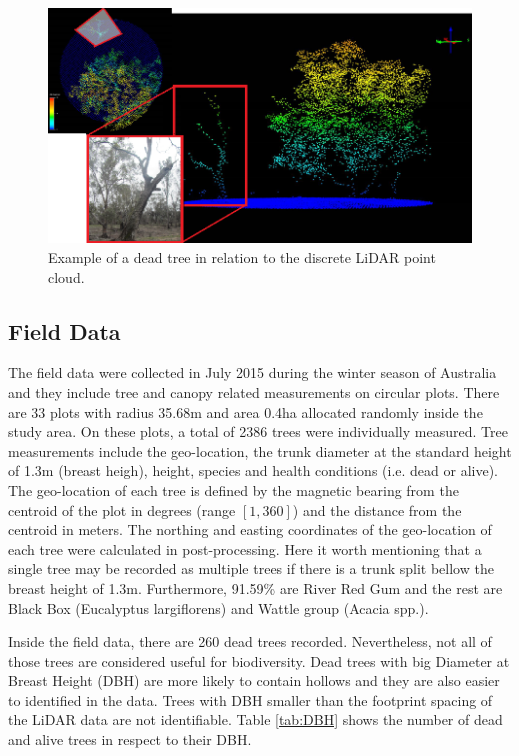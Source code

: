 \documentclass{subfiles}
\begin{document}
 \begin{figure} [h!]
 	\centering
 	\includegraphics[width=\textwidth]{img/DeadTreeInLiDAR}
 	\caption{Example of a dead tree in relation to the discrete LiDAR point cloud.}
 	\label{fig:DeadTreeInLiDAR}
 \end{figure}



\subsection{Field Data}

\par The field data were collected in July 2015 during the winter season of Australia and they include tree and canopy related measurements on circular plots. There are 33 plots with radius 35.68m and area 0.4ha  allocated randomly inside the study area. On these plots, a total of 2386 trees were individually measured.  Tree measurements include the geo-location, the trunk diameter at the standard height of 1.3m (breast heigh), height, species and health conditions (i.e. dead or alive). The geo-location of each tree is defined by the magnetic bearing from the centroid of the plot in degrees (range $[1,360]$) and the distance from the centroid in meters. The northing and easting coordinates of the geo-location of each tree were calculated in post-processing. Here it worth mentioning that a single tree may be recorded as multiple trees if there is a trunk split bellow the breast height of 1.3m. Furthermore, 91.59\% are River Red Gum and the rest are Black Box (Eucalyptus largiflorens) and Wattle group (Acacia spp.).

\par Inside the field data, there are 260 dead trees recorded. Nevertheless, not all of those trees are considered useful for biodiversity. Dead trees with big Diameter at Breast Height (DBH) are more likely to contain hollows and they are also easier to identified in the data. Trees with DBH smaller than the footprint spacing of the LiDAR data are not identifiable. Table \ref{tab:DBH} shows the number of dead and alive trees in respect to their DBH. 
\end{document}
